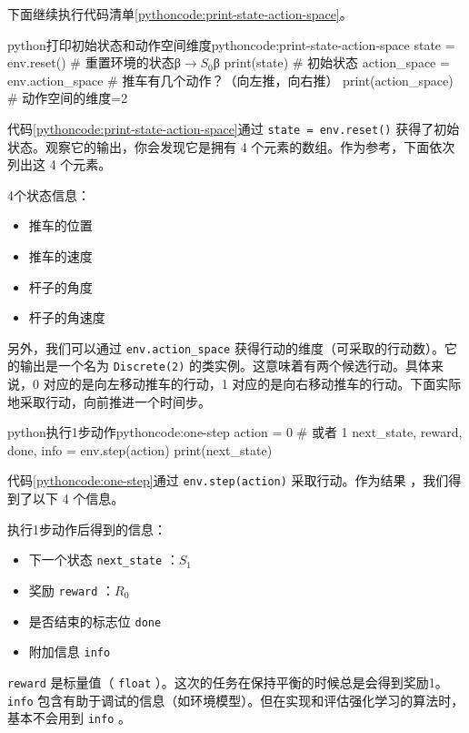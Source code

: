 \documentclass[lang=cn,newtx,10pt,scheme=chinese]{elegantbook}
\newcommand{\py}[1]{%
  \colorbox{gray!10}{\texttt{#1}}%
}
\begin{document}
下面继续执行代码清单\ref{pythoncode:print-state-action-space}。

\begin{codebox}{python}{打印初始状态和动作空间维度}{pythoncode:print-state-action-space}
state = env.reset() # 重置环境的状态β$\rightarrow S_0$β
print(state) # 初始状态
action_space = env.action_space # 推车有几个动作？（向左推，向右推）
print(action_space) # 动作空间的维度=2
\end{codebox}

代码\ref{pythoncode:print-state-action-space}通过\py{state = env.reset()}获得了初始状态。观察它的输出，你会发现它是拥有 4 个元素的数组。作为参考，下面依次列出这 4 个元素。

\begin{marker}
4个状态信息：
\begin{itemize}
\item 推车的位置
\item 推车的速度
\item 杆子的角度
\item 杆子的角速度
\end{itemize}
\end{marker}

另外，我们可以通过 \py{env.action_space} 获得行动的维度（可采取的行动数）。它的输出是一个名为 \py{Discrete(2)} 的类实例。这意味着有两个候选行动。具体来说，0 对应的是向左移动推车的行动，1 对应的是向右移动推车的行动。下面实际地采取行动，向前推进一个时间步。

\begin{codebox}{python}{执行1步动作}{pythoncode:one-step}
action = 0 # 或者 1
next_state, reward, done, info = env.step(action)
print(next_state)
\end{codebox}

代码\ref{pythoncode:one-step}通过 \py{env.step(action)} 采取行动。作为结果 ，我们得到了以下 4 个信息。

\begin{marker}
执行1步动作后得到的信息：
\begin{itemize}
\item 下一个状态\py{next_state}：$S_1$
\item 奖励\py{reward}：$R_0$
\item 是否结束的标志位\py{done}
\item 附加信息\py{info}
\end{itemize}
\end{marker}

\py{reward}是标量值（\py{float}）。这次的任务在保持平衡的时候总是会得到奖励1。\py{info}包含有助于调试的信息（如环境模型）。但在实现和评估强化学习的算法时，基本不会用到\py{info}。
\end{document}
